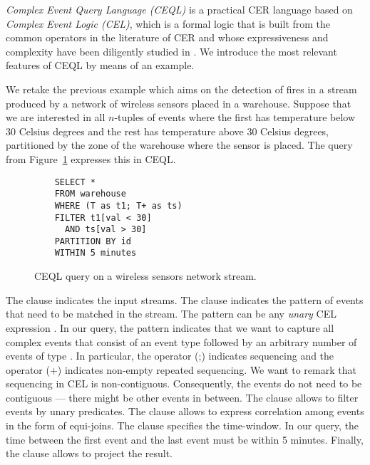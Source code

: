 \emph{Complex Event Query Language (CEQL)} is a practical CER language based on \emph{Complex Event Logic (CEL)}, which is a formal logic that is built from the common operators in the literature of CER and whose expressiveness and complexity have been diligently studied in \cite{formal-framework-cep,on-the-expressiveness,formal-framework-cer}. We introduce the most relevant features of CEQL by means of an example.

\begin{example}
We retake the previous example which aims on the detection of fires in a stream produced by a network of wireless sensors placed in a warehouse. Suppose that we are interested in all $n$-tuples of  events where the first has temperature below $30$ Celsius degrees and the rest has temperature above $30$ Celsius degrees, partitioned by the zone of the warehouse where the sensor is placed. The query from Figure~\ref{fig:query:2} expresses this in CEQL.

\begin{figure}[H]
  \begin{verbatim}
    SELECT *
    FROM warehouse
    WHERE (T as t1; T+ as ts)
    FILTER t1[val < 30]
      AND ts[val > 30]
    PARTITION BY id
    WITHIN 5 minutes
  \end{verbatim}
  \caption{CEQL query on a wireless sensors network stream.}
  \label{fig:query:2}
\end{figure}

The  clause indicates the input streams. The  clause indicates the pattern of events that need to be matched in the stream. The pattern can be any \emph{unary} CEL expression \cite{formal-framework-cer}. In our query, the pattern  indicates that we want to capture all complex events that consist of an event type  followed by an arbitrary number of events of type . In particular, the operator (;) indicates sequencing and the operator (+) indicates non-empty repeated sequencing. We want to remark that sequencing in CEL is non-contiguous. Consequently, the  events do not need to be contiguous --- there might be other events in between. The  clause allows to filter events by unary predicates. The clause  allows to express correlation among events in the form of equi-joins. The  clause specifies the time-window. In our query, the time between the first event  and the last event  must be within 5 minutes. Finally, the  clause allows to project the result.
\end{example}

